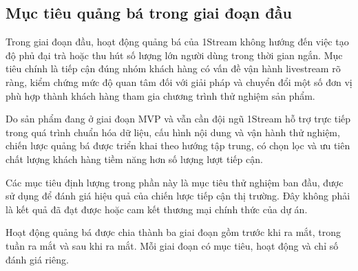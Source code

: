 %
%



\subsection{Mục tiêu quảng bá trong giai đoạn đầu}

Trong giai đoạn đầu, hoạt động quảng bá của 1Stream không hướng đến việc tạo độ phủ đại trà hoặc thu hút số lượng lớn người dùng trong thời gian ngắn. Mục tiêu chính là tiếp cận đúng nhóm khách hàng có vấn đề vận hành livestream rõ ràng, kiểm chứng mức độ quan tâm đối với giải pháp và chuyển đổi một số đơn vị phù hợp thành khách hàng tham gia chương trình thử nghiệm sản phẩm.

Do sản phẩm đang ở giai đoạn MVP và vẫn cần đội ngũ 1Stream hỗ trợ trực tiếp trong quá trình chuẩn hóa dữ liệu, cấu hình nội dung và vận hành thử nghiệm, chiến lược quảng bá được triển khai theo hướng tập trung, có chọn lọc và ưu tiên chất lượng khách hàng tiềm năng hơn số lượng lượt tiếp cận.

Các mục tiêu định lượng trong phần này là mục tiêu thử nghiệm ban đầu, được sử dụng để đánh giá hiệu quả của chiến lược tiếp cận thị trường. Đây không phải là kết quả đã đạt được hoặc cam kết thương mại chính thức của dự án.


Hoạt động quảng bá được chia thành ba giai đoạn gồm trước khi ra mắt, trong tuần ra mắt và sau khi ra mắt. Mỗi giai đoạn có mục tiêu, hoạt động và chỉ số đánh giá riêng.


